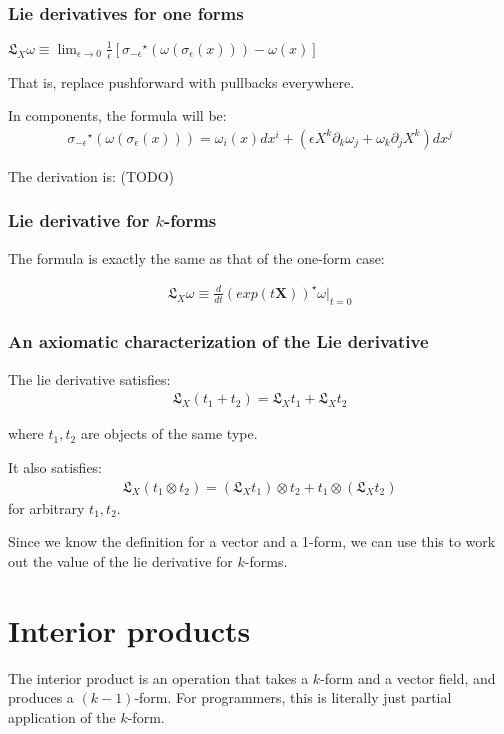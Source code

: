 \documentclass[11pt]{book}
\newcommand{\Lie}{\ensuremath{\mathfrak{L}}}
\newcommand{\pullback}[1]{\ensuremath{{#1}^{\star}}}
\begin{document}
\subsection{Lie derivatives for one forms}

$\Lie_X \omega \equiv \lim_{\epsilon \to 0} \frac{1}{\epsilon} 
\left[
\pullback{\sigma_{-\epsilon}} (\omega(\sigma_\epsilon(x))) - \omega(x)
\right]$

That is, replace pushforward with pullbacks everywhere.

In components, the formula will be:
\begin{align*}
    \pullback{\sigma_{-\epsilon}} (\omega(\sigma_\epsilon(x))) = \omega_i(x) dx^i + 
    (\epsilon X^k \partial_k \omega_j + \omega_k \partial_j X^k) dx^j
\end{align*}

The derivation is: (TODO)

\subsection{Lie derivative for $k$-forms}

The formula is exactly the same as that of the one-form case:

\begin{align*}
\Lie_X \omega \equiv \frac{d}{dt}\pullback{\left(exp(t\mathbf X)\right)} \omega|_{t = 0}
\end{align*}

\subsection{An axiomatic characterization of the Lie derivative}

The lie derivative satisfies:
\begin{align*}
    \Lie_X(t_1 + t_2) = \Lie_X t_1 + \Lie_X t_2
\end{align*}

where $t_1, t_2$ are objects of the same type.

It also satisfies:
\begin{align*}
    \Lie_X(t_1 \otimes t_2) = (\Lie_X t_1) \otimes t_2 + t_1 \otimes (\Lie_X t_2) 
\end{align*}
for arbitrary $t_1, t_2$.

Since we know the definition for a vector and a 1-form, we can use this to work
out the value of the lie derivative for $k$-forms.


\chapter{Interior products}
The interior product is an operation that takes a $k$-form and a vector field,
and produces a $(k-1)$-form.  For programmers, this is literally just partial
application of the $k$-form.
\end{document}
